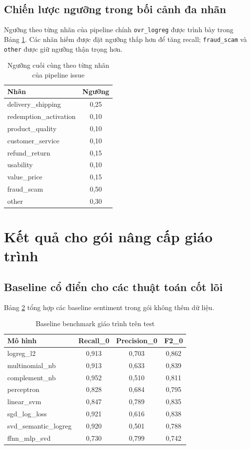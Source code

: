 ﻿\documentclass[12pt,a4paper]{article}
\begin{document}
\subsection{Chiến lược ngưỡng trong bối cảnh đa nhãn}
Ngưỡng theo từng nhãn của pipeline chính \texttt{ovr\_logreg} được trình bày trong Bảng \ref{tab:issue_thresholds_vi}. Các nhãn hiếm được đặt ngưỡng thấp hơn để tăng recall; \texttt{fraud\_scam} và \texttt{other} được giữ ngưỡng thận trọng hơn.

\begin{table}[H]
\centering
\caption{Ngưỡng cuối cùng theo từng nhãn của pipeline issue}
\label{tab:issue_thresholds_vi}
\begin{tabular}{lc}
\toprule
Nhãn & Ngưỡng \\
\midrule
delivery\_shipping & 0,25 \\
redemption\_activation & 0,10 \\
product\_quality & 0,10 \\
customer\_service & 0,10 \\
refund\_return & 0,15 \\
usability & 0,10 \\
value\_price & 0,15 \\
fraud\_scam & 0,50 \\
other & 0,30 \\
\bottomrule
\end{tabular}
\end{table}

\section{Kết quả cho gói nâng cấp giáo trình}
\subsection{Baseline cổ điển cho các thuật toán cốt lõi}
Bảng \ref{tab:syllabus_baselines_vi} tổng hợp các baseline sentiment trong gói không thêm dữ liệu.

\begin{table}[H]
\centering
\caption{Baseline benchmark giáo trình trên test}
\label{tab:syllabus_baselines_vi}
\begin{tabular}{lccc}
\toprule
Mô hình & Recall\_0 & Precision\_0 & F2\_0 \\
\midrule
logreg\_l2 & 0,913 & 0,703 & 0,862 \\
multinomial\_nb & 0,913 & 0,633 & 0,839 \\
complement\_nb & 0,952 & 0,510 & 0,811 \\
perceptron & 0,828 & 0,684 & 0,795 \\
linear\_svm & 0,847 & 0,789 & 0,835 \\
sgd\_log\_loss & 0,921 & 0,616 & 0,838 \\
svd\_semantic\_logreg & 0,920 & 0,501 & 0,788 \\
ffnn\_mlp\_svd & 0,730 & 0,799 & 0,742 \\
\bottomrule
\end{tabular}
\end{table}
\end{document}
